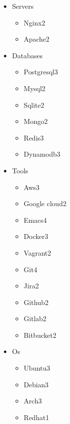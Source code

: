 \documentclass[11pt,letter,sans]{moderncv}
\begin{document}
\begin{itemize}
\begin{itemize}
\item Webapck\hfill 3\item Brunch\hfill 2\item Gulp\hfill 2\item Grunt\hfill 2\end{itemize}
      \item Servers
      \begin{itemize}
\item Nginx\hfill 2\item Apache\hfill 2\end{itemize}
      \item Databases
      \begin{itemize}
\item Postgresql\hfill 3\item Mysql\hfill 2\item Sqlite\hfill 2\item Mongo\hfill 2\item Redis\hfill 3\item Dynamodb\hfill 3\end{itemize}
      \item Tools
      \begin{itemize}
\item Aws\hfill 3\item Google cloud\hfill 2\item Emacs\hfill 4\item Docker\hfill 3\item Vagrant\hfill 2\item Git\hfill 4\item Jira\hfill 2\item Github\hfill 2\item Gitlab\hfill 2\item Bitbucket\hfill 2\end{itemize}
      \item Os
      \begin{itemize}
\item Ubuntu\hfill 3\item Debian\hfill 3\item Arch\hfill 3\item Redhat\hfill 1\end{itemize}
  \end{itemize}
\end{document}
